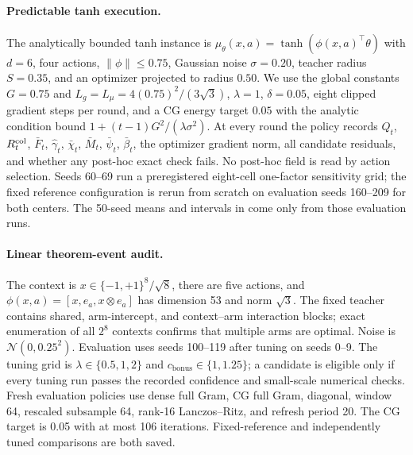 \documentclass[twoside]{article}
\newcommand{\cbonus}{c_{\mathrm{bonus}}} %
\begin{document}
\paragraph{Predictable tanh execution.}
The analytically bounded tanh instance is
$\mu_\theta(x,a)=\tanh(\phi(x,a)^\top\theta)$ with $d=6$, four actions,
$\|\phi\|\le0.75$, Gaussian noise $\sigma=0.20$, teacher radius $S=0.35$,
and an optimizer projected to radius $0.50$.  We use the global constants
$G=0.75$ and $L_g=L_\mu=4(0.75)^2/(3\sqrt3)$, $\lambda=1$,
$\delta=0.05$, eight clipped gradient steps per round, and a CG energy target
$0.05$ with the analytic condition bound
$1+(t-1)G^2/(\lambda\sigma^2)$.  At every round the policy records $Q_t$,
$R_t^{\rm col}$, $\bar F_t$, $\hat\gamma_t$, $\bar\chi_t$, $\bar M_t$,
$\bar\psi_t$, $\bar\beta_t$, the optimizer gradient norm, all candidate
residuals, and whether any post-hoc exact check fails.  No post-hoc field is
read by action selection.  Seeds 60--69 run a preregistered eight-cell
one-factor sensitivity grid; the fixed reference configuration is rerun from
scratch on evaluation seeds 160--209 for both centers.  The 50-seed means and
intervals in  come only from those evaluation runs.

\paragraph{Linear theorem-event audit.}
The context is $x\in\{-1,+1\}^8/\sqrt8$, there are five actions, and
$\phi(x,a)=[x,e_a,x\otimes e_a]$ has dimension 53 and norm $\sqrt3$.  The fixed
teacher contains shared, arm-intercept, and context--arm interaction blocks; exact
enumeration of all $2^8$ contexts confirms that multiple arms are optimal.  Noise
is $\mathcal N(0,0.25^2)$.  Evaluation uses seeds 100--119 after tuning on seeds
0--9.  The tuning grid is $\lambda\in\{0.5,1,2\}$ and
$\cbonus\in\{1,1.25\}$; a candidate is eligible only if every tuning run passes
the recorded confidence and small-scale numerical checks.  Fresh
evaluation policies use dense full Gram, CG full Gram, diagonal, window 64,
rescaled subsample 64, rank-16 Lanczos--Ritz, and refresh period 20.  The CG target
is 0.05 with at most 106 iterations.  Fixed-reference and independently tuned
comparisons are both saved.
\end{document}
